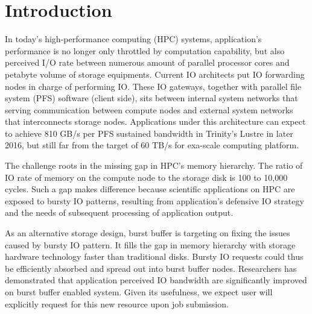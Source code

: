 \section{Introduction}

In today's high-performance computing (HPC) systems,
application's performance is no longer only throttled by computation capability,
but also perceived I/O rate between
numerous amount of parallel processor cores and 
petabyte volume of storage equipments.
Current IO architects put IO forwarding nodes in charge of performing IO.
These IO gateways, together with parallel file system (PFS) software (client side),
sits between internal system networks that serving communication
between compute nodes and external system networks
that interconnects storage nodes\cite{Ross:IOSystem}.
Applications under this architecture can expect to achieve
810 GB/s per PFS sustained bandwidth in Trinity's Lustre\cite{TrinitySystem}
in later 2016, but still far from the target of 60 TB/s
for exa-scale computing platform\cite{Shalf:HPCCS:2010}.

The challenge roots in the missing gap in HPC's memory hierarchy.
The ratio of IO rate of memory on the compute node to the storage disk
is 100 to 10,000 cycles\cite{TrinitySystem}.
Such a gap makes difference because scientific applications on HPC are exposed to
bursty IO patterns\cite{Carns:MSST:2011, Kim:PDSW:2010},
resulting from application's
defensive IO strategy\cite{Latham:CSD:2012, Naik:ICPPW:2009, Dennis:CUG:2009}
and the needs of subsequent processing of application output.



As an alternative storage design, burst buffer\cite{Bent:HBP:2011, Grider:EXA:2010}
is targeting on fixing the issues caused by bursty IO pattern.
It fills the gap in memory hierarchy with storage hardware technology
faster than traditional disks.
Bursty IO requests could thus be efficiently absorbed and spread out
into burst buffer nodes.
Researchers\cite{Liu:MSST:2012} has demonstrated that application perceived IO
bandwidth are significantly improved on burst buffer enabled system.
Given its usefulness, we expect user will explicitly request for
this new resource upon job submission.

